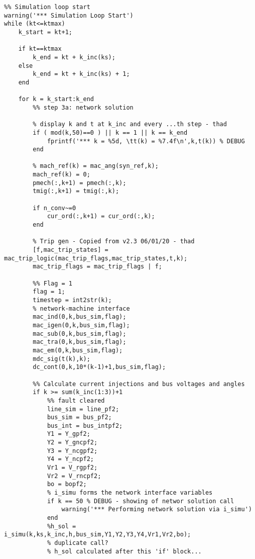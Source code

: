 \documentclass[12pt]{article}
\begin{document}



\begin{verbatim}
%% Simulation loop start
warning('*** Simulation Loop Start')
while (kt<=ktmax)
    k_start = kt+1;
    
    if kt==ktmax
        k_end = kt + k_inc(ks);
    else
        k_end = kt + k_inc(ks) + 1;
    end
    
    for k = k_start:k_end
        %% step 3a: network solution
        
        % display k and t at k_inc and every ...th step - thad
        if ( mod(k,50)==0 ) || k == 1 || k == k_end
            fprintf('*** k = %5d, \tt(k) = %7.4f\n',k,t(k)) % DEBUG
        end
        
        % mach_ref(k) = mac_ang(syn_ref,k);
        mach_ref(k) = 0;
        pmech(:,k+1) = pmech(:,k);
        tmig(:,k+1) = tmig(:,k);
        
        if n_conv~=0
            cur_ord(:,k+1) = cur_ord(:,k);
        end
        
        % Trip gen - Copied from v2.3 06/01/20 - thad
        [f,mac_trip_states] = mac_trip_logic(mac_trip_flags,mac_trip_states,t,k);
        mac_trip_flags = mac_trip_flags | f;
        
        %% Flag = 1    
        flag = 1;
        timestep = int2str(k);
        % network-machine interface
        mac_ind(0,k,bus_sim,flag);
        mac_igen(0,k,bus_sim,flag);
        mac_sub(0,k,bus_sim,flag);
        mac_tra(0,k,bus_sim,flag);
        mac_em(0,k,bus_sim,flag);
        mdc_sig(t(k),k);
        dc_cont(0,k,10*(k-1)+1,bus_sim,flag);
        
        %% Calculate current injections and bus voltages and angles
        if k >= sum(k_inc(1:3))+1
            %% fault cleared
            line_sim = line_pf2;
            bus_sim = bus_pf2;
            bus_int = bus_intpf2;
            Y1 = Y_gpf2;
            Y2 = Y_gncpf2;
            Y3 = Y_ncgpf2;
            Y4 = Y_ncpf2;
            Vr1 = V_rgpf2;
            Vr2 = V_rncpf2;
            bo = bopf2;
            % i_simu forms the network interface variables
            if k == 50 % DEBUG - showing of networ solution call
                warning('*** Performing network solution via i_simu')
            end
            %h_sol = i_simu(k,ks,k_inc,h,bus_sim,Y1,Y2,Y3,Y4,Vr1,Vr2,bo);
            % duplicate call?
            % h_sol calculated after this 'if' block...
            

\end{verbatim}
\end{document}
